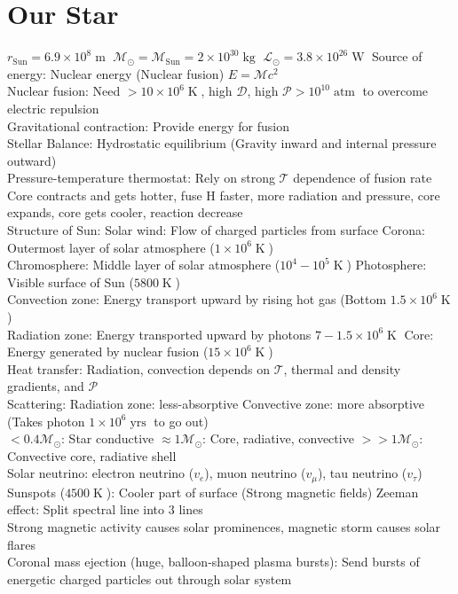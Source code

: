 \documentclass{article}
\DeclareMathOperator{\yrs}{yrs}
\DeclareMathOperator{\m}{m}
\DeclareMathOperator{\kg}{kg}
\DeclareMathOperator{\atm}{atm}
\DeclareMathOperator{\K}{K}
\DeclareMathOperator{\W}{W}
\begin{document}
\section{Our Star}
$r_{\text{Sun}}=6.9\times 10^{8}\m$ \quad $\mathcal{M}_{\odot}=\mathcal{M}_{\text{Sun}}=2\times 10^{30}\kg$ \quad $\mathcal{L}_{\odot}=3.8\times 10^{26}\W$ \quad Source of energy: Nuclear energy (Nuclear fusion) $E=\mathcal{M}c^{2}$\\
Nuclear fusion: Need $>10\times 10^{6}\K$, high $\mathcal{D}$, high $\mathcal{P}>10^{10}\atm$ to overcome electric repulsion\\
Gravitational contraction: Provide energy for fusion \\
Stellar Balance: Hydrostatic equilibrium (Gravity inward and internal pressure outward)\\
Pressure-temperature thermostat: Rely on strong $\mathcal{T}$ dependence of fusion rate\\
Core contracts and gets hotter, fuse H faster, more radiation and pressure, core expands, core gets cooler, reaction decrease\\
Structure of Sun: Solar wind: Flow of charged particles from surface \qquad Corona: Outermost layer of solar atmosphere ($1\times 10^{6}\K$)\\
Chromosphere: Middle layer of solar atmosphere ($10^{4}-10^{5}\K$) \qquad Photosphere: Visible surface of Sun ($5800\K$)\\
Convection zone: Energy transport upward by rising hot gas (Bottom $1.5\times 10^{6}\K$)\\
Radiation zone: Energy transported upward by photons $7-1.5\times 10^{6}\K$ \qquad Core: Energy generated by nuclear fusion ($15\times 10^{6}\K$)\\
Heat transfer: Radiation, convection \quad depends on $\mathcal{T}$, thermal and density gradients, and $\mathcal{P}$\\
Scattering: Radiation zone: less-absorptive \quad Convective zone: more absorptive (Takes photon $1\times 10^{6}\yrs$ to go out)\\
$<0.4\mathcal{M}_{\odot}$: Star conductive \quad $\approx 1\mathcal{M}_{\odot}$: Core, radiative, convective \quad $>>1\mathcal{M}_{\odot}$: Convective core, radiative shell\\
Solar neutrino: electron neutrino ($v_{e}$), muon neutrino  ($v_{\mu}$), tau neutrino ($v_{\tau}$)\\
Sunspots ($4500\K$): Cooler part of surface (Strong magnetic fields) \quad Zeeman effect: Split spectral line into 3 lines\\
Strong magnetic activity causes solar prominences, magnetic storm causes solar flares\\
Coronal mass ejection (huge, balloon-shaped plasma bursts): Send bursts of energetic charged particles out through solar system
\newpage
\end{document}
